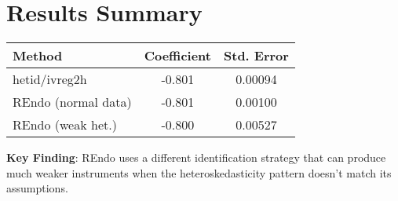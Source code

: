 \documentclass[11pt]{article}
\begin{document}
\section*{Results Summary}

\begin{table}[h]
\centering
\begin{tabular}{lcc}
\toprule
Method & Coefficient & Std. Error \\
\midrule
hetid/ivreg2h & -0.801 & 0.00094 \\
REndo (normal data) & -0.801 & 0.00100 \\
REndo (weak het.) & -0.800 & 0.00527 \\
\bottomrule
\end{tabular}
\end{table}

\textbf{Key Finding}: REndo uses a different identification strategy that can produce much weaker instruments when the heteroskedasticity pattern doesn't match its assumptions.
\end{document}
